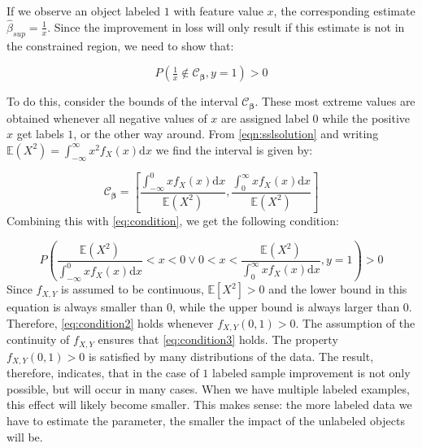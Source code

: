 \documentclass{elsarticle}
\begin{document}
\begin{pf}
If we observe an object labeled $1$ with feature value $x$, the corresponding estimate $\hat{\beta}_{sup}=\tfrac{1}{x}$. Since the improvement in loss will only result if this estimate is not in the constrained region, we need to show that:

\begin{equation} \label{eq:condition}
P(\tfrac{1}{x} \notin \mathcal{C}_{\boldsymbol{\beta}},y=1)>0
\end{equation}

To do this, consider the bounds of the interval $\mathcal{C}_{\boldsymbol{\beta}}$. These most extreme values are obtained whenever all negative values of $x$ are assigned label $0$ while the positive $x$ get labels $1$, or the other way around. From \eqref{eqn:sslsolution} and writing $\mathbb{E}(X^2)=\int_{-\infty}^{\infty} { x^2 f_X(x) \mathrm{d}x}$ we find the interval is given by:  

\begin{equation} \label{eq:condition2}
\mathcal{C}_{\boldsymbol{\beta}}=\left[ \frac{\int_{-\infty}^{0}{x f_X(x) \mathrm{d}x }}{\mathbb{E}(X^2)},\frac{\int_{0}^{\infty}{x f_X(x)  \mathrm{d}x }}{\mathbb{E}(X^2)} \right]
\end{equation}
Combining this with \eqref{eq:condition}, we get the following condition:

\begin{equation} \label{eq:condition3}
P \left( \frac{\mathbb{E}(X^2)}{\int_{-\infty}^{0}{x f_X(x)  \mathrm{d}x }} < x < 0 \vee 0 < x < \frac{\mathbb{E}(X^2)}{\int_{0}^{\infty}{x f_X(x)  \mathrm{d}x }},y=1 \right) > 0
\end{equation}
Since $f_{X,Y}$ is assumed to be continuous, $\mathbb{E}[X^2]>0$ and the lower bound in this equation is always smaller than $0$, while the upper bound is always larger than $0$.  Therefore, \eqref{eq:condition2} holds whenever $f_{X,Y}(0,1)>0$. The assumption of the continuity of $f_{X,Y}$ ensures that  \eqref{eq:condition3} holds.  The property $f_{X,Y}(0,1)>0$ is satisfied by many distributions of the data. The result, therefore, indicates, that in the case of $1$ labeled sample improvement is not only possible, but will occur in many cases. When we have multiple labeled examples, this effect will likely become smaller. This makes sense: the more labeled data we have to estimate the parameter, the smaller the impact of the unlabeled objects will be.

\end{pf}
\end{document}
